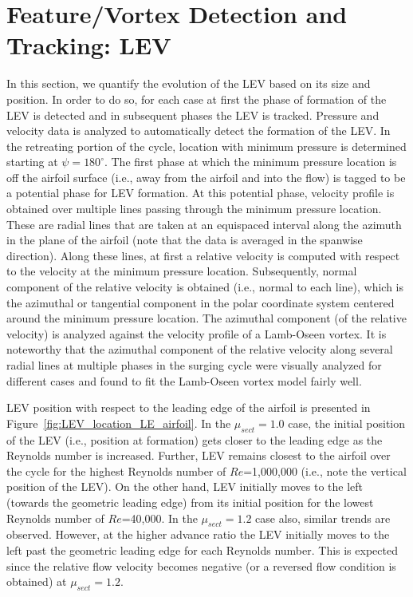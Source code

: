 \section{Feature/Vortex Detection and Tracking: LEV}
\label{sec:LEV}

In this section, we quantify the evolution of the LEV based on its size and position.
In order to do so, for each case at first the phase of formation of the LEV is detected and in subsequent phases the LEV is tracked.
Pressure and velocity data is analyzed to automatically detect the formation of the LEV.
In the retreating portion of the cycle, location with minimum pressure is determined starting at $\psi=180^\circ$.
The first phase at which the minimum pressure location is off the airfoil surface (i.e., away from the airfoil and into the flow) is tagged to be a potential phase for LEV formation.
At this potential phase, velocity profile is obtained over multiple lines passing through the minimum pressure location.
These are radial lines that are taken at an equispaced interval along the azimuth in the plane of the airfoil (note that the data is averaged in the spanwise direction).
Along these lines, at first a relative velocity is computed with respect to the velocity at the minimum pressure location.
Subsequently, normal component of the relative velocity is obtained (i.e., normal to each line), which is the azimuthal or tangential component in the polar coordinate system centered around the minimum pressure location.
The azimuthal component (of the relative velocity) is analyzed against the velocity profile of a Lamb-Oseen vortex.
It is noteworthy that the azimuthal component of the relative velocity along several radial lines at multiple phases in the surging cycle were visually analyzed for different cases and found to fit the Lamb-Oseen vortex model fairly well.


LEV position with respect to the leading edge of the airfoil is presented in Figure~\ref{fig:LEV_location_LE_airfoil}.
In the $\mu_{sect}=1.0$ case, the initial position of the LEV (i.e., position at formation) gets closer to the leading edge as the Reynolds number is increased.
Further, LEV remains closest to the airfoil over the cycle for the highest Reynolds number of $Re$=1,000,000 (i.e., note the vertical position of the LEV).
On the other hand, LEV initially moves to the left (towards the geometric leading edge) from its initial position for the lowest Reynolds number of $Re$=40,000.
In the $\mu_{sect}=1.2$ case also, similar trends are observed.
However, at the higher advance ratio the LEV initially moves to the left past the geometric leading edge for each Reynolds number.
This is expected since the relative flow velocity becomes negative (or a reversed flow condition is obtained) at $\mu_{sect}=1.2$.

